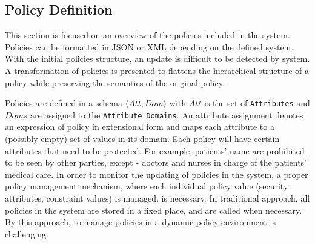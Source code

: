 \documentclass[conference]{IEEEtran}
\begin{document}
\subsection{Policy Definition}\label{BG:PD}
This section is focused on an overview of the policies included in the system.
Policies can be formatted in JSON \cite{thi2017using} or XML\cite{rissanen2013extensible} depending on the defined system.
With the initial policies structure, an update is difficult to be detected by system.
A transformation of policies is presented  to flattens the hierarchical structure of a policy while preserving the semantics of the original policy. 

Policies are defined in a schema $\langle Att, Dom \rangle$ with $Att$ is the set of \texttt{Attributes} and $Doms$ are assigned to the \texttt{Attribute Domains}. 
An attribute assignment denotes an expression of policy in extensional form and maps each attribute to a (possibly empty) set of values in its domain. 
Each policy will have certain attributes that need to be protected. 
For example, patients' name are prohibited to be seen by other parties, except - doctors and nurses in charge of the patients' medical care. 
In order to monitor the updating of policies in the system, a proper policy management mechanism, where each individual policy value (security attributes, constraint values) is managed, is necessary. 
In traditional approach, all policies in the system are stored in a fixed place, and are called when necessary. 
By this approach, to manage policies in a dynamic policy environment is challenging.
\end{document}
